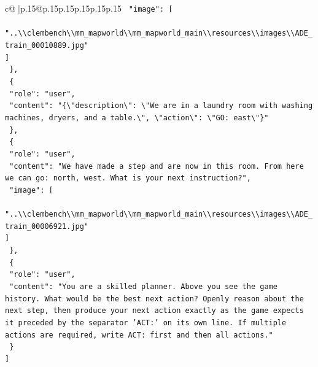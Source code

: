 \documentclass{article}
\begin{document}
{\begin{supertabular}{c@{$\;$}|p{.15\linewidth}@{}p{.15\linewidth}p{.15\linewidth}p{.15\linewidth}p{.15\linewidth}p{.15\linewidth}}
{{{\texttt{    "image": {[}} \\
\texttt{      "..\textbackslash{}\textbackslash{}clembench\textbackslash{}\textbackslash{}mm\_mapworld\textbackslash{}\textbackslash{}mm\_mapworld\_main\textbackslash{}\textbackslash{}resources\textbackslash{}\textbackslash{}images\textbackslash{}\textbackslash{}ADE\_train\_00010889.jpg"} \\
\texttt{    {]}} \\
\texttt{  \},} \\
\texttt{  \{} \\
\texttt{    "role": "user",} \\
\texttt{    "content": "\{\textbackslash{}"description\textbackslash{}": \textbackslash{}"We are in a laundry room with washing machines, dryers, and a table.\textbackslash{}", \textbackslash{}"action\textbackslash{}": \textbackslash{}"GO: east\textbackslash{}"\}"} \\
\texttt{  \},} \\
\texttt{  \{} \\
\texttt{    "role": "user",} \\
\texttt{    "content": "We have made a step and are now in this room. From here we can go: north, west. What is your next instruction?",} \\
\texttt{    "image": {[}} \\
\texttt{      "..\textbackslash{}\textbackslash{}clembench\textbackslash{}\textbackslash{}mm\_mapworld\textbackslash{}\textbackslash{}mm\_mapworld\_main\textbackslash{}\textbackslash{}resources\textbackslash{}\textbackslash{}images\textbackslash{}\textbackslash{}ADE\_train\_00006921.jpg"} \\
\texttt{    {]}} \\
\texttt{  \},} \\
\texttt{  \{} \\
\texttt{    "role": "user",} \\
\texttt{    "content": "You are a skilled planner. Above you see the game history. What would be the best next action? Openly reason about the next step, then produce your next action exactly as the game expects it preceded by the separator 'ACT:' on its own line. If multiple actions are required, write ACT: first and then all actions."} \\
\texttt{  \}} \\
\texttt{{]}} \\
            }
        }
    }
     \\ \\


\end{supertabular}}
\end{document}
